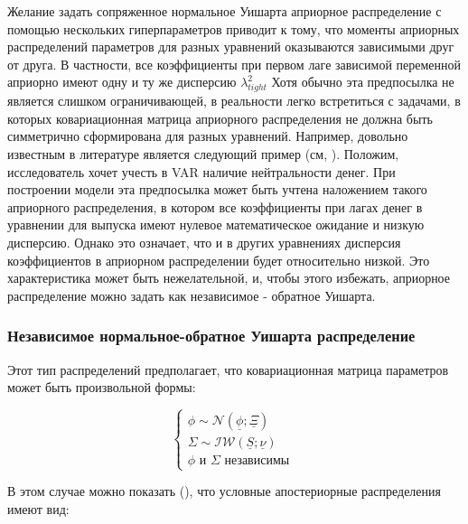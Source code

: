 \documentclass[11pt]{article} %
\newcommand{\cN}{\mathcal{N}}
\newcommand{\cIW}{\mathcal{IW}}
\newcommand{\prior}{\underline}
\begin{document}

Желание задать сопряженное нормальное Уишарта априорное распределение с помощью нескольких гиперпараметров приводит к тому, что моменты априорных распределений параметров для разных уравнений оказываются зависимыми друг от друга. В частности, все коэффициенты при первом лаге зависимой переменной априорно имеют одну и ту же дисперсию $\lambda_{tight}^2$  Хотя обычно эта предпосылка не является слишком ограничивающей, в реальности легко встретиться с задачами, в которых ковариационная матрица априорного распределения не должна быть симметрично сформирована для разных уравнений. Например, довольно известным в литературе является следующий пример (см, \cite{kadiyala_karlsson_1997}). Положим, исследователь хочет  учесть в VAR наличие нейтральности денег. При построении модели эта предпосылка может быть учтена наложением такого априорного распределения, в котором все коэффициенты при лагах денег в уравнении для выпуска имеют нулевое математическое ожидание и низкую дисперсию. Однако это означает, что и в других уравнениях дисперсия коэффициентов в априорном распределении будет относительно низкой. Это характеристика может быть нежелательной, и, чтобы этого избежать,   априорное распределение можно задать как независимое - обратное Уишарта.

\subsubsection{Независимое нормальное-обратное Уишарта распределение}

Этот тип распределений предполагает, что ковариационная матрица параметров может быть произвольной формы:

\begin{equation}
\begin{cases}
\phi \sim \cN(\prior\phi; \prior\Xi ) \\
\Sigma \sim \cIW(\prior S; \prior\nu) \\
\phi \text{ и } \Sigma \text{ независимы }
\end{cases}
\end{equation}


В этом случае можно показать (\cite{karlsson_2012}), что условные апостериорные распределения имеют вид:
\end{document}
